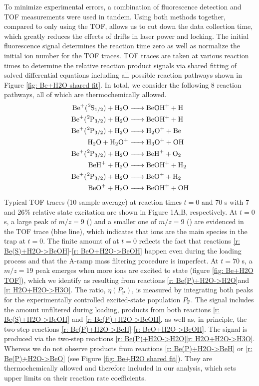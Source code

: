 To minimize experimental errors, a combination of fluorescence detection and TOF measurements were used in tandem. Using both methods together, compared to only using the TOF, allows us to cut down the data collection time, which greatly reduces the effects of drifts in laser power and locking. The initial fluorescence signal determines the reaction time zero as well as normalize the initial ion number for the TOF traces. TOF traces are taken at various reaction times to determine the relative reaction product signals via shared fitting of solved differential equations including all possible reaction pathways shown in Figure \ref{fig: Be+H2O shared fit}. In total, we consider the following 8 reaction pathways, all of which are thermochemically allowed.
\begin{align}
	\ce{Be+(^2S1/2) + H2O & -> BeOH+ + H} \label{r: Be(S)+H2O->BeOH} \\
	\ce{Be+(^2P3/2) + H2O & -> BeOH+ + H} \label{r: Be(P)+H2O->BeOH} \\
	\ce{Be+(^2P3/2) + H2O & -> H2O+ + Be} \label{r: Be(P)+H2O->H2O} \\
	\ce{H2O + H2O+ & -> H3O+ + OH} \label{r: H2O+H2O->H3O} \\
	\ce{Be+(^2P3/2) + H2O & -> BeH+ + O2} \label{r: Be(P)+H2O->BeH} \\
	\ce{BeH+ + H2O & -> BeOH+ + H2} \label{r: BeH+H2O->BeOH} \\
	\ce{Be+(^2P3/2) + H2O & -> BeO+ + H2} \label{r: Be(P)+H2O->BeO} \\
	\ce{BeO+ + H2O & -> BeOH+ + OH} \label{r: BeO+H2O->BeOH}
\end{align}
Typical TOF traces (10 sample average) at reaction times $t=0$ and 70 s with 7 and 26\% relative  state excitation are shown in Figure 1A,B, respectively. At $t=0$ s, a large peak of $m/z=9$ () and a smaller one of $m/z=9$ () are evidenced in the TOF trace (blue line), which indicates that  ions are the main species in the trap at $t=0$. The finite amount of  at $t=0$ reflects the fact that reactions \ref{r: Be(S)+H2O->BeOH}-\ref{r: BeO+H2O->BeOH} happen even during the loading process and that the A-ramp mass filtering procedure is imperfect. At $t=70$ s, a $m/z=19$ peak emerges when more  ions are excited to  state (figure \ref{fig: Be+H2O TOF}), which we identify as  resulting from reactions \ref{r: Be(P)+H2O->H2O}and \ref{r: H2O+H2O->H3O}. The  ratio, $\eta(P_\text{P})$, is measured by integrating both peaks for the experimentally controlled excited-state population $P_\text{P}$. The  signal includes the amount unfiltered during loading, products from both reactions \ref{r: Be(S)+H2O->BeOH} and \ref{r: Be(P)+H2O->BeOH}, as well as, in principle, the two-step reactions \ref{r: Be(P)+H2O->BeH}-\ref{r: BeO+H2O->BeOH}. The  signal is produced via the two-step reactions \ref{r: Be(P)+H2O->H2O}\ref{r: H2O+H2O->H3O}. Whereas we do not observe products from reactions \ref{r: Be(P)+H2O->BeH} or \ref{r: Be(P)+H2O->BeO} (see Figure \ref{fig: Be+H2O shared fit}). They are thermochemically allowed and therefore included in our analysis, which sets upper limits on their reaction rate coefficients.

